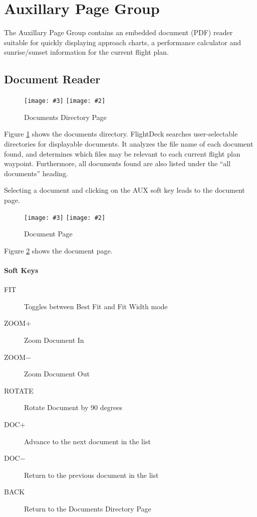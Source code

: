 \documentclass[a4paper,10pt,pdftex]{article}
\newcommand{\jnxfig}[3][]{\ifmypdf\texttt{[image: \#3]}
  \else\texttt{[image: \#2]}\fi}
\begin{document}
\section{Auxillary Page Group}

The Auxillary Page Group contains an embedded document (PDF) reader
suitable for quickly displaying approach charts, a performance
calculator and sunrise/sunset information for the current flight plan.

\subsection{Document Reader}

\begin{figure}[!htbp]
  \begin{center}
    \jnxfig[scale=0.5]{docdirpage.eps}{docdirpage.png}
    \caption{Documents Directory Page}
    \label{fig:docdirpage}
  \end{center}
\end{figure}

Figure \ref{fig:docdirpage} shows the documents directory. FlightDeck
searches user-selectable directories for displayable documents. It
analyzes the file name of each document found, and determines which
files may be relevant to each current flight plan
waypoint. Furthermore, all documents found are also listed under the
``all documents'' heading.

Selecting a document and clicking on the AUX soft key leads to the
document page.

\begin{figure}[!htbp]
  \begin{center}
    \jnxfig[scale=0.5]{docpage.eps}{docpage.png}
    \caption{Document Page}
    \label{fig:docpage}
  \end{center}
\end{figure}

Figure \ref{fig:docpage} shows the document page.

\paragraph{Soft Keys}

\begin{description}
\item[FIT] Toggles between Best Fit and Fit Width mode
\item[ZOOM$+$] Zoom Document In
\item[ZOOM$-$] Zoom Document Out
\item[ROTATE] Rotate Document by 90 degrees
\item[DOC$+$] Advance to the next document in the list
\item[DOC$-$] Return to the previous document in the list
\item[BACK] Return to the Documents Directory Page
\end{description}
\end{document}
